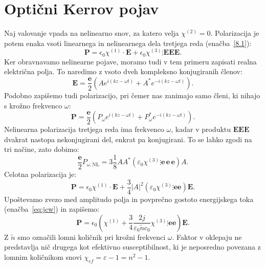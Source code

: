 \section{Optični Kerrov pojav}
\label{OKP}
Naj valovanje vpada na nelinearno snov, za katero velja $\chi^{(2)} = 0$.
Polarizacija je potem enaka vsoti linearnega in nelinearnega dela tretjega reda 
(enačba~\ref{8.1}):
\begin{equation}
\mathbf{P}=
\epsilon_{0} \chi^{(1)}\cdot \mathbf{E}+
\epsilon_{0}\chi^{(3)}\vdots \mathbin \mathbf{E}\mathbin \mathbf{E}\mathbin\mathbf{E}.
\end{equation}
Ker obravnavamo nelinearne pojave, moramo tudi v tem primeru zapisati realna
električna polja. To naredimo z vsoto dveh kompleksno konjugiranih členov:
\begin{equation}
\mathbf{E}=\frac{\mathbf{e}}{2}\left(Ae^{i(kz-\omega t)}+A^{*}e^{-i(kz-\omega t)}\right)\!\!.
\label{8.71}
\end{equation}
Podobno zapišemo tudi polarizacijo, pri čemer nas zanimajo samo členi,
ki nihajo s krožno frekvenco $\omega$:
\begin{equation}
\mathbf{P}=\frac{\mathbf{e}}{2}\left(P_\omega e^{i(kz-\omega t)}+P_\omega^{*}e^{-i(kz-\omega t)}\right)\!\!.
\label{8.71a}
\end{equation}
Nelinearna polarizacija tretjega reda ima frekvenco $\omega$, kadar v produktu 
$\mathbf{E}\mathbin \mathbf{E}\mathbin\mathbf{E}$ 
dvakrat nastopa nekonjugirani del, enkrat pa konjugirani. To se lahko zgodi na tri
načine, zato dobimo:
\begin{equation}
\frac{\mathbf{e}}{2}P_{\omega,\mathrm{NL}} = 3 \frac{1}{8} A A^* \left( 
\varepsilon_0 \chi^{(3)}\vdots \mathbf{e}\, \mathbf{e} \, \mathbf{e} \right) A.
\label{pomega}
\end{equation}
Celotna polarizacija je:
\begin{equation}
\mathbf{P}=
\epsilon_{0} \chi^{(1)}\cdot \mathbf{E}+\frac{3}{4} |A|^2 \left( 
\varepsilon_0 \chi^{(3)}\vdots \mathbin \mathbf{e}\mathbin \mathbf{e} \right) \mathbf{E}.
\label{eq:ptnl}
\end{equation}
Upoštevamo zvezo med amplitudo polja in povprečno gostoto energijskega toka (enačba~\ref{eq:jcw}) in
zapišemo:
\begin{equation}
\mathbf{P}=
\epsilon_{0} \left( \chi^{(1)} +\frac{3}{4} \frac{2  j }
{\varepsilon_0 \tilde{n} c_0} \chi^{(3)}\vdots \mathbin \mathbf{e}\mathbin 
\mathbf{e} \right) \mathbf{E}.
\label{eq:pppeee}
\end{equation}
Z $\tilde{n}$ smo označili lomni količnik pri krožni frekvenci $\omega$. 
Faktor v oklepaju ne predstavlja nič drugega kot efektivno susceptibilnost, 
ki je neposredno povezana z lomnim količnikom snovi $\chi_{ef}=\varepsilon-1 =n^2 -1$.

